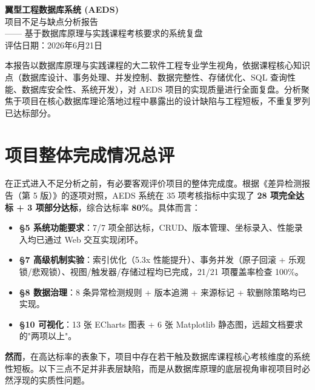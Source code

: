 \documentclass[UTF8,a4paper,11pt]{ctexart}
\begin{document}
\begin{center}
    {\LARGE \bfseries 翼型工程数据库系统 (AEDS)} \\
    \vspace{0.3cm}
    {\Large \textcolor{mainblue}{项目不足与缺点分析报告}} \\
    \vspace{0.2cm}
    {\normalsize —— 基于数据库原理与实践课程考核要求的系统复盘} \\
    \vspace{0.5cm}
    {\normalsize 评估日期：2026年6月21日}
\end{center}

\vspace{1cm}

\begin{tcolorbox}[colback=mainblue!5, colframe=mainblue, title=评估说明]
本报告以数据库原理与实践课程的大二软件工程专业学生视角，依据课程核心知识点（数据库设计、事务处理、并发控制、数据完整性、存储优化、SQL 查询性能、数据库安全性、系统开发），对 AEDS 项目的实现质量进行全面复盘。分析聚焦于项目在核心数据库理论落地过程中暴露出的设计缺陷与工程短板，不重复罗列已达标部分。
\end{tcolorbox}

\section{项目整体完成情况总评}

在正式进入不足分析之前，有必要客观评价项目的整体完成度。根据《差异检测报告（第 5 版）》的逐项对照，AEDS 系统在 35 项考核指标中实现了 \textbf{28 项完全达标 + 3 项部分达标}，综合达标率 \textbf{80\%}。具体而言：

\begin{itemize}
    \item \textbf{§5 系统功能要求}：7/7 项全部达标，CRUD、版本管理、坐标录入、性能录入均已通过 Web 交互实现闭环。
    \item \textbf{§7 高级机制实验}：索引优化（5.3x 性能提升）、事务并发（原子回滚 + 乐观锁/悲观锁）、视图/触发器/存储过程均已完成，21/21 项覆盖率检查 100\%。
    \item \textbf{§8 数据治理}：8 条异常检测规则 + 版本追溯 + 来源标记 + 软删除策略均已实现。
    \item \textbf{§10 可视化}：13 张 ECharts 图表 + 6 张 Matplotlib 静态图，远超文档要求的"两项以上"。
\end{itemize}

\textbf{然而}，在高达标率的表象下，项目中存在若干触及数据库课程核心考核维度的系统性短板。以下三点不足并非表层缺陷，而是从数据库原理的底层视角审视项目时必然浮现的实质性问题。
\end{document}
